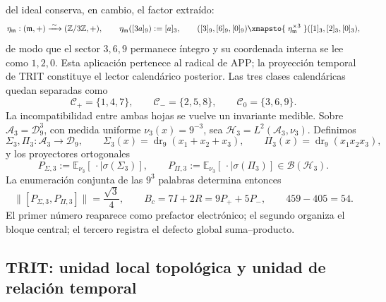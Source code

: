 del ideal conserva, en cambio, el factor extraído:
\begin{equation}
\eta_{\mathfrak m}:(\mathfrak m,+)
\xrightarrow{\;\sim\;}(\mathbb Z/3\mathbb Z,+),
\qquad
\eta_{\mathfrak m}([3a]_9):=[a]_3,
\qquad
([3]_9,[6]_9,[0]_9)
\xmapsto{\;\eta_{\mathfrak m}^{\times3}\;}
([1]_3,[2]_3,[0]_3),
\label{p12-83-c3-s1:eq:app-369-120}
\end{equation}
de modo que el sector \(3,6,9\) permanece íntegro y su coordenada interna se
lee como \(1,2,0\). Esta aplicación pertenece al radical de APP; la
proyección temporal de TRIT constituye el lector calendárico posterior. Las
tres clases calendáricas
quedan separadas como
\[
\mathcal C_+=\{1,4,7\},\qquad
\mathcal C_-=\{2,5,8\},\qquad
\mathcal C_0=\{3,6,9\}.
\]
La incompatibilidad entre ambas hojas se vuelve un invariante medible. Sobre
\(\mathscr A_3=\mathcal D_9^3\), con medida uniforme
\(\nu_3(x)=9^{-3}\), sea
\(\mathcal H_3=L^2(\mathscr A_3,\nu_3)\). Definimos
\[
\Sigma_3,\Pi_3:\mathscr A_3\longrightarrow\mathcal D_9,
\qquad
\Sigma_3(x)=\operatorname{dr}_9(x_1+x_2+x_3),
\qquad
\Pi_3(x)=\operatorname{dr}_9(x_1x_2x_3),
\]
y los proyectores ortogonales
\[
P_{\Sigma,3}:=\mathbb E_{\nu_3}[\,\cdot\mid\sigma(\Sigma_3)],
\qquad
P_{\Pi,3}:=\mathbb E_{\nu_3}[\,\cdot\mid\sigma(\Pi_3)]
\in\mathcal B(\mathcal H_3).
\]
La enumeración conjunta de las \(9^3\) palabras determina entonces
\[
\bigl\|[P_{\Sigma,3},P_{\Pi,3}]\bigr\|=\frac{\sqrt3}{4},
\qquad
B_c=7I+2R=9P_++5P_-,
\qquad
459-405=54.
\]
El primer número reaparece como prefactor electrónico; el segundo organiza
el bloque central; el tercero registra el defecto global suma--producto.

\subsection{TRIT: unidad local topológica y unidad de relación temporal}

